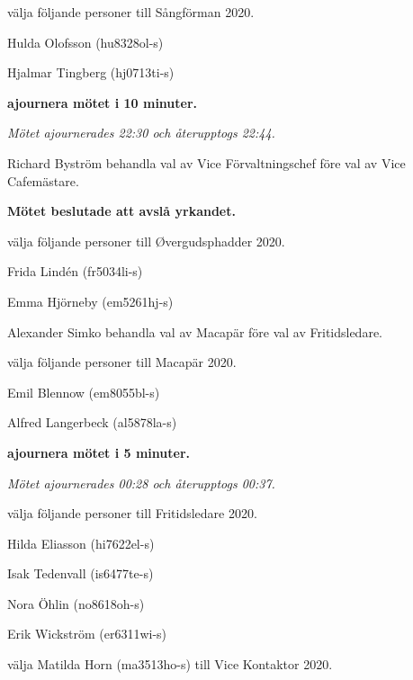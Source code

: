 \documentclass[10pt]{article}
\begin{document}
\begin{paragrafer}
\begin{paralist}
    \Mba välja följande personer till Sångförman 2020. 
    \begin{tightdashlist}
        \item Hulda Olofsson (hu8328ol-s)
        \item Hjalmar Tingberg (hj0713ti-s)
    \end{tightdashlist}

    \textbf{\Mba ajournera mötet i 10 minuter.}

    \emph{Mötet ajournerades 22:30 och återupptogs 22:44.}

    Richard Byström \ypa behandla val av Vice Förvaltningschef före val av Vice Cafemästare.

    \textbf{Mötet beslutade att avslå yrkandet.}

    \Mba välja följande personer till Øvergudsphadder 2020.
    \begin{tightdashlist}
        \item Frida Lindén (fr5034li-s)
        \item Emma Hjörneby (em5261hj-s)
    \end{tightdashlist}

    Alexander Simko \ypa behandla val av Macapär före val av Fritidsledare.

    \textbf{\Mbaby}

    \Mba välja följande personer till Macapär 2020.
    \begin{tightdashlist}
        \item Emil Blennow (em8055bl-s)
        \item Alfred Langerbeck (al5878la-s)
    \end{tightdashlist}

    \textbf{\Mba ajournera mötet i 5 minuter.}

    \emph{Mötet ajournerades 00:28 och återupptogs 00:37.}

    \Mba välja följande personer till Fritidsledare 2020.
    \begin{tightdashlist}
        \item Hilda Eliasson (hi7622el-s)
        \item Isak Tedenvall (is6477te-s)
        \item Nora Öhlin (no8618oh-s)
        \item Erik Wickström (er6311wi-s)
    \end{tightdashlist}

    \Mba välja Matilda Horn (ma3513ho-s) till Vice Kontaktor 2020.


\end{paralist}
\end{paragrafer}
\end{document}
